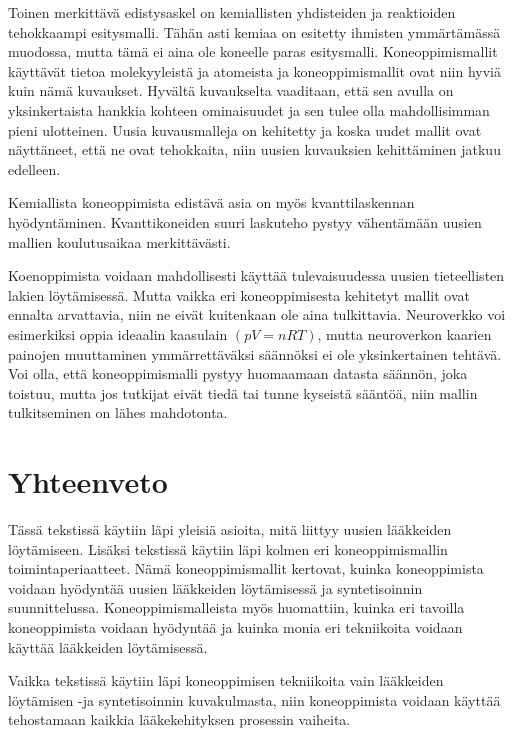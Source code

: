\documentclass[finnish,twoside,censored,tkt,sw-line]{HYthesisML}
\begin{document}
Toinen merkittävä edistysaskel on kemiallisten yhdisteiden ja reaktioiden tehokkaampi esitysmalli.
Tähän asti kemiaa on esitetty ihmisten ymmärtämässä muodossa, mutta tämä ei aina ole koneelle paras esitysmalli.
Koneoppimismallit käyttävät tietoa molekyyleistä ja atomeista ja koneoppimismallit ovat niin hyviä kuin nämä kuvaukset.
Hyvältä kuvaukselta vaaditaan, että sen avulla on yksinkertaista hankkia kohteen ominaisuudet ja sen tulee olla mahdollisimman pieni ulotteinen.
Uusia kuvausmalleja on kehitetty ja koska uudet mallit ovat näyttäneet, että ne ovat tehokkaita, niin uusien kuvauksien kehittäminen jatkuu edelleen.

Kemiallista koneoppimista edistävä asia on myös kvanttilaskennan hyödyntäminen.
Kvanttikoneiden suuri laskuteho pystyy vähentämään uusien mallien koulutusaikaa merkittävästi.

Koenoppimista voidaan mahdollisesti käyttää tulevaisuudessa uusien tieteellisten lakien löytämisessä.
Mutta vaikka eri koneoppimisesta kehitetyt mallit ovat ennalta arvattavia, niin ne eivät kuitenkaan ole aina tulkittavia.
Neuroverkko voi esimerkiksi oppia ideaalin kaasulain \((pV=nRT)\), mutta neuroverkon kaarien painojen muuttaminen ymmärrettäväksi säännöksi ei ole yksinkertainen tehtävä.
Voi olla, että koneoppimismalli pystyy huomaamaan datasta säännön, joka toistuu, mutta jos tutkijat eivät tiedä tai tunne kyseistä sääntöä, niin mallin tulkitseminen on lähes mahdotonta.

\chapter{Yhteenveto}

Tässä tekstissä käytiin läpi yleisiä asioita, mitä liittyy uusien lääkkeiden löytämiseen.
Lisäksi tekstissä käytiin läpi kolmen eri koneoppimismallin toimintaperiaatteet.
Nämä koneoppimismallit kertovat, kuinka koneoppimista voidaan hyödyntää uusien lääkkeiden löytämisessä ja syntetisoinnin suunnittelussa.
Koneoppimismalleista myös huomattiin, kuinka eri tavoilla koneoppimista voidaan hyödyntää ja kuinka monia eri tekniikoita voidaan käyttää lääkkeiden löytämisessä.

Vaikka tekstissä käytiin läpi koneoppimisen tekniikoita vain lääkkeiden löytämisen -ja syntetisoinnin kuvakulmasta, niin koneoppimista voidaan käyttää tehostamaan kaikkia lääkekehityksen prosessin vaiheita.


\cleardoublepage{}                          %
\printbibliography{}
\end{document}
